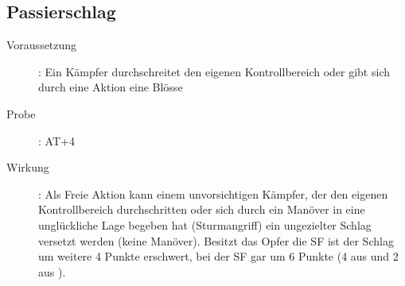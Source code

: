 \subsection{Passierschlag}
\label{aktion.passierschlag}
\begin{description}
    \item[Voraussetzung]:
        Ein Kämpfer durchschreitet den eigenen Kontrollbereich oder gibt sich durch eine Aktion eine Blösse
    \item[Probe]:
        AT+4
    \item[Wirkung]:
        Als Freie Aktion kann einem unvorsichtigen Kämpfer, der den eigenen Kontrollbereich durchschritten oder sich durch ein Manöver in eine unglückliche Lage begeben hat (Sturmangriff) ein ungezielter Schlag versetzt werden (keine Manöver).
        Besitzt das Opfer die SF  ist der Schlag um weitere 4 Punkte erschwert, bei der SF  gar um 6 Punkte (4 aus  und 2 aus ).
\end{description}
